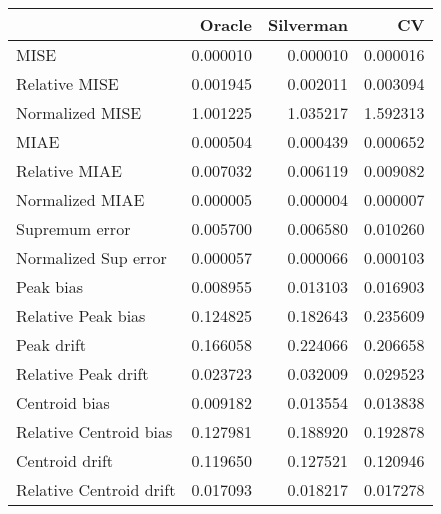 \begin{tabular}{lrrr}
  \toprule
 & Oracle & Silverman & CV \\ 
  \midrule
MISE & 0.000010 & 0.000010 & 0.000016 \\ 
  Relative MISE & 0.001945 & 0.002011 & 0.003094 \\ 
  Normalized MISE & 1.001225 & 1.035217 & 1.592313 \\ 
  MIAE & 0.000504 & 0.000439 & 0.000652 \\ 
  Relative MIAE & 0.007032 & 0.006119 & 0.009082 \\ 
  Normalized MIAE & 0.000005 & 0.000004 & 0.000007 \\ 
  Supremum error & 0.005700 & 0.006580 & 0.010260 \\ 
  Normalized Sup error & 0.000057 & 0.000066 & 0.000103 \\ 
  Peak bias & 0.008955 & 0.013103 & 0.016903 \\ 
  Relative Peak bias & 0.124825 & 0.182643 & 0.235609 \\ 
  Peak drift & 0.166058 & 0.224066 & 0.206658 \\ 
  Relative Peak drift & 0.023723 & 0.032009 & 0.029523 \\ 
  Centroid bias & 0.009182 & 0.013554 & 0.013838 \\ 
  Relative Centroid bias & 0.127981 & 0.188920 & 0.192878 \\ 
  Centroid drift & 0.119650 & 0.127521 & 0.120946 \\ 
  Relative Centroid drift & 0.017093 & 0.018217 & 0.017278 \\ 
   \bottomrule
\end{tabular}
